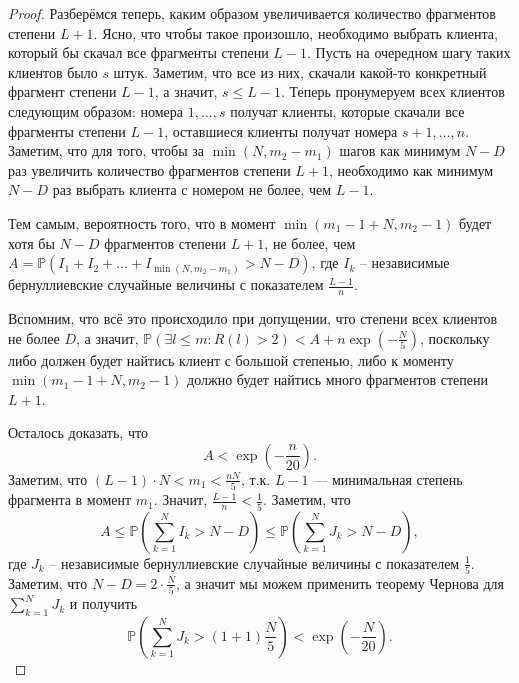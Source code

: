 \documentclass{matmex-diploma-custom}
\newcommand{\PRob}{\mathbb P}
\newcommand{\leqs}{\leqslant}
\theoremstyle{named}
\begin{document}
\begin{proof}
Разберёмся теперь, каким образом увеличивается количество фрагментов степени $L+1$. 
Ясно, что чтобы такое произошло, необходимо выбрать клиента, который бы скачал все фрагменты степени $L-1$. 
Пусть на очередном шагу таких клиентов было $s$ штук. Заметим, что все из них, скачали какой-то конкретный фрагмент степени $L-1$, 
а значит, $s \leqs L-1$. Теперь пронумеруем всех клиентов следующим образом: номера $1, \dots, s$ получат клиенты, 
которые скачали все фрагменты степени $L-1$, оставшиеся клиенты получат номера $s +1, \dots, n$.
Заметим, что для того, чтобы за $\min(N, m_2 - m_1)$ шагов как минимум $N-D$ раз увеличить количество фрагментов степени $L+1$,
необходимо как минимум $N-D$ раз выбрать клиента с номером не более, чем $L-1$.

Тем самым, вероятность того, что в момент $\min(m_1 - 1 + N, m_2 - 1)$ будет хотя бы $N-D$ фрагментов степени $L+1$, 
не более, чем $ A = \PRob(I_1 + I_2 + \dots + I_{\min(N, m_2 - m_1)} > N - D)$, 
где $I_k$ -- независимые бернуллиевские случайные величины с показателем $\frac{L-1}{n}$.

Вспомним, что всё это происходило при допущении, что степени всех клиентов не более $D$, 
а значит, $\PRob\left(\exists l \leqs m : R(l) > 2 \right) < A +  n\exp\left(-\frac{N}{5}\right)$, 
поскольку либо должен будет найтись клиент с большой степенью, 
либо к моменту $\min(m_1 - 1 + N, m_2 - 1)$ должно будет найтись много фрагментов степени $L+1$.

Осталось доказать, что 
\begin{equation}
A < \exp\left(- \frac{n}{20}\right).
\end{equation}
Заметим, что $(L-1)\cdot N < m_1 < \frac{nN}{5}$, т.к. $L-1$ --- минимальная степень фрагмента в момент $m_1$.
Значит, $\frac{L-1}{n} < \frac{1}{5}$. Заметим, что
\begin{equation}
A \leqs \PRob\left(\sum_{k = 1}^N I_k > N - D\right) \leqs \PRob\left(\sum_{k = 1}^N J_k > N - D\right),
\end{equation}
где $J_k$ -- независимые бернуллиевские случайные величины с показателем $\frac{1}{5}$. 
Заметим, что $N - D = 2\cdot \frac{N}{5}$, а значит мы можем применить 
теорему Чернова для $\sum\limits_{k = 1}^N J_k$ и получить
\begin{equation}
\PRob\left(\sum_{k = 1}^N J_k > (1 + 1) \frac{N}{5}\right) < \exp\left( - \frac{N}{20}\right).
\end{equation}
\end{proof}
\end{document}
